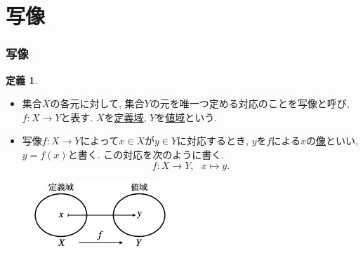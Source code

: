 \documentclass[dvipdfmx,cjk,10.2pt]{beamer}
\theoremstyle{definition}
\newtheorem{Def}[Thm]{定義}
\begin{document}

\section{写像}

\begin{frame}
\frametitle{写像}

\begin{Def} \label{写像定義}
\begin{itemize}
\item 集合$X$の各元に対して, 集合$Y$の元を唯一つ定める対応のことを写像と呼び, $f:X \rightarrow Y$と表す. 
$X$を\underline{定義域}, $Y$を\underline{値域}という. 
\item 写像$f:X\rightarrow Y$によって$x \in X$が$y\in Y$に対応するとき, $y$を$f$による$x$の\underline{像}といい, $y=f(x)$と書く. 
この対応を次のように書く. \vspace{-1mm}
$$
f:X \longrightarrow Y, \ \ \ x \mapsto y. 
$$
\end{itemize}
\end{Def}

\vspace{-1mm}

 \begin{figure}[htbp]
 \begin{center} 
  \includegraphics[width=50mm]{map.png}
 \end{center}
\end{figure}

\vspace{-1mm}

\end{frame}


\end{document}
